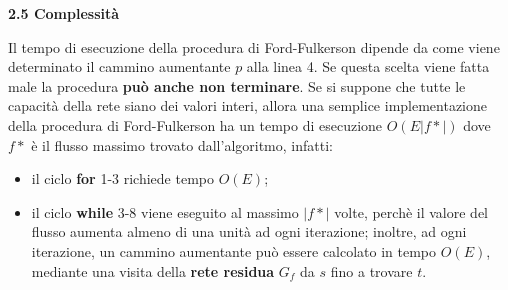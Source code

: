 \documentclass{article}
\begin{document}
\hfill
\begin{flushleft}
\begin{Large} \textbf{2.5 Complessità} \end{Large}
\newline
\newline
Il tempo di esecuzione della procedura di Ford-Fulkerson dipende da come viene determinato il cammino aumentante $p$ alla linea 4.
\newline
Se questa scelta viene fatta male la procedura \textbf{può anche non terminare}.
\newline
Se si suppone che tutte le capacità della rete siano dei valori interi, allora una semplice implementazione della procedura di Ford-Fulkerson ha un tempo di esecuzione \textbf{$O(E|f*|)$} dove $f*$ è il flusso massimo trovato dall'algoritmo, infatti:
\newline
\begin{itemize}
    \item il ciclo \textbf{for} 1-3 richiede tempo $O(E)$;
    \item il ciclo \textbf{while} 3-8 viene eseguito al massimo $|f*|$ volte, perchè il valore del flusso aumenta almeno di una unità ad ogni iterazione; inoltre, ad ogni iterazione, un cammino aumentante può essere calcolato in tempo $O(E)$, mediante una visita della \textbf{rete residua} $G_f$ da $s$ fino a trovare $t$.
\end{itemize}
\end{flushleft}
\end{document}
